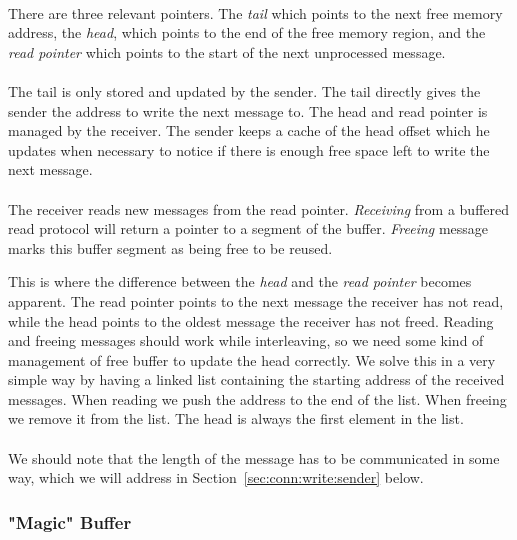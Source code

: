 \paragraph{}There are three relevant pointers. The \emph{tail} which points to the next free memory address, the \emph{head},
which points to  the end of the free memory region, and the \emph{read pointer} which points to the start of the next
unprocessed message. 

\paragraph{} The tail is only stored and updated by the sender. The tail directly gives the sender the address to write the 
next message to. The head and read pointer is managed by the receiver. The sender keeps a cache of the head offset which he
updates when necessary to notice if there is enough free space left to write the next message.

\paragraph{} The receiver reads new messages from the read pointer. \emph{Receiving} from a buffered read protocol will 
return a pointer to a segment of the buffer. \emph{Freeing} message marks this buffer segment as being free to be reused.

This is where the difference between the \emph{head} and the \emph{read pointer} becomes apparent. The read pointer points 
to the next message the receiver has not read, while the head points to the oldest message the receiver has not freed. Reading
and freeing messages should work while interleaving, so we need some kind of management of free buffer to update the head 
correctly. We solve this in a very simple way by having a linked list containing the starting address of the received messages.
When reading we push the address to the end of the list. When freeing we remove it from the list. The head is always the first 
element in the list.

\paragraph{}We should note that the length of the message has to be communicated in some way, which we will address in  
Section~\ref{sec:conn:write:sender} below.





\subsubsection{"Magic" Buffer} 

